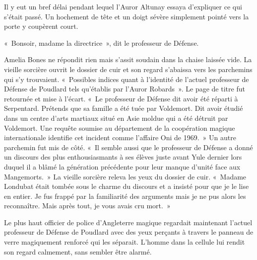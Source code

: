 Il y eut un bref délai pendant lequel l'Auror Altunay essaya d'expliquer ce qui s'était passé. Un hochement de tête et un doigt sévère simplement pointé vers la porte y coupèrent court.

«~Bonsoir, madame la directrice~», dit le professeur de Défense.

Amelia Bones ne répondit rien mais s'assit soudain dans la chaise laissée vide. La vieille sorcière ouvrit le dossier de cuir et son regard s'abaissa vers les parchemins qui s'y trouvaient. «~Possibles indices quant à l'identité de l'actuel professeur de Défense de Poudlard tels qu'établis par l'Auror Robards~». Le page de titre fut retournée et mise à l'écart. «~Le professeur de Défense dit avoir été réparti à Serpentard. Prétends que sa famille a été tuée par Voldemort. Dit avoir étudié dans un centre d'arts martiaux situé en Asie moldue qui a été détruit par Voldemort. Une requête soumise au département de la coopération magique internationale identifie cet incident comme l'affaire Oni de 1969.~» Un autre parchemin fut mis de côté. «~Il semble aussi que le professeur de Défense a donné un discours des plus enthousiasmants à ses élèves juste avant Yule dernier lors duquel il a blâmé la génération précédente pour leur manque d'unité face aux Mangemorts.~» La vieille sorcière releva les yeux du dossier de cuir. «~Madame Londubat était tombée sous le charme du discours et a insisté pour que je le lise en entier. Je fus frappé par la familiarité des arguments mais je ne pus alors les reconnaître. Mais après tout, je vous avais cru mort.~»

Le plus haut officier de police d'Angleterre magique regardait maintenant l'actuel professeur de Défense de Poudlard avec des yeux perçants à travers le panneau de verre magiquement renforcé qui les séparait. L'homme dans la cellule lui rendit son regard calmement, sans sembler être alarmé.

